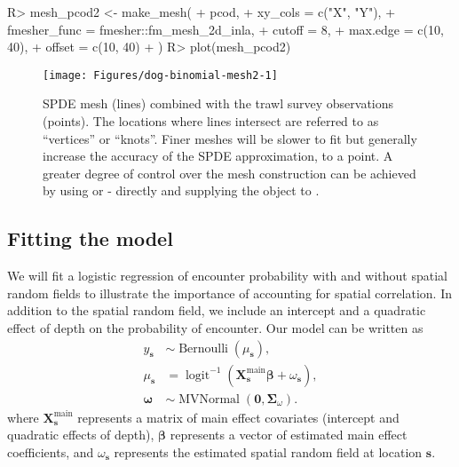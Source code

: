 \documentclass[article]{jss}\usepackage[]{graphicx}\usepackage[dvipsnames]{xcolor}
\newcommand{\s}{\bm{s}}
\begin{document}
\begin{Schunk}
\begin{Sinput}
R> mesh_pcod2 <- make_mesh(
+    pcod,
+    xy_cols = c("X", "Y"),
+    fmesher_func = fmesher::fm_mesh_2d_inla,
+    cutoff = 8,
+    max.edge = c(10, 40),
+    offset = c(10, 40)
+  )
R> plot(mesh_pcod2)
\end{Sinput}
\begin{figure}[ht]

{\centering \texttt{[image: Figures/dog-binomial-mesh2-1]} 

}

\caption[SPDE mesh (lines) combined with the trawl survey observations (points)]{SPDE mesh (lines) combined with the trawl survey observations (points). The locations where lines intersect are referred to as ``vertices'' or ``knots''. Finer meshes will be slower to fit but generally increase the accuracy of the SPDE approximation, to a point. A greater degree of control over the mesh construction can be achieved by using  or - directly and supplying the object to .}\label{fig:dog-binomial-mesh2}
\end{figure}
\end{Schunk}

\subsection{Fitting the model}

We will fit a logistic regression of encounter probability with and without spatial random fields to illustrate the importance of accounting for spatial correlation.
In addition to the spatial random field, we include an intercept and a quadratic effect of depth on the probability of encounter.
Our model can be written as
\[
\begin{aligned}
y_{\bm{s}} &\sim \operatorname{Bernoulli} \left(\mu_{\bm{s}}\right),\\
\mu_{\bm{s}} &= \operatorname{logit}^{-1} \left( \bm{X}^{\mathrm{main}}_{\bm{s}} \bm{\beta} +
\omega_{\bm{s}} \right),\\
\boldsymbol{\omega} &\sim \operatorname{MVNormal}
  \left( \boldsymbol{0}, \boldsymbol{\Sigma}_\omega \right).
\end{aligned}
\]
where \(\bm{X}^{\mathrm{main}}_{\bm{s}}\) represents a matrix of main effect covariates (intercept and quadratic effects of depth), \(\bm{\beta}\) represents a vector of estimated main effect coefficients, and \(\omega_{\bm{s}}\) represents the estimated spatial random field at location $\s$.
\end{document}
